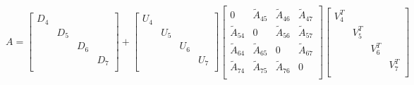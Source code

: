 \begin{equation*}
    A =
    \begin{bmatrix}
        D_4    & & & \\
        & D_5    & & \\
        & & D_6    & \\
        & & & D_7    \\
    \end{bmatrix}
    +
    \begin{bmatrix}
        U_4    & & & \\
        & U_5    & & \\
        & & U_6    & \\
        & & & U_7    \\
    \end{bmatrix}
    \begin{bmatrix}
        0    & \widetilde{A}_{45} & \widetilde{A}_{46} & \widetilde{A}_{47} \\
        \widetilde{A}_{54} & 0 & \widetilde{A}_{56} & \widetilde{A}_{57} \\
        \widetilde{A}_{64} & \widetilde{A}_{65} & 0 & \widetilde{A}_{67} \\
        \widetilde{A}_{74} & \widetilde{A}_{75} & \widetilde{A}_{76} &    0 \\
    \end{bmatrix}
    \begin{bmatrix}
        V^T_4    & & & \\
        & V^T_5    & & \\
        & & V^T_6    & \\
        & & & V^T_7    \\
    \end{bmatrix}
\end{equation*}
